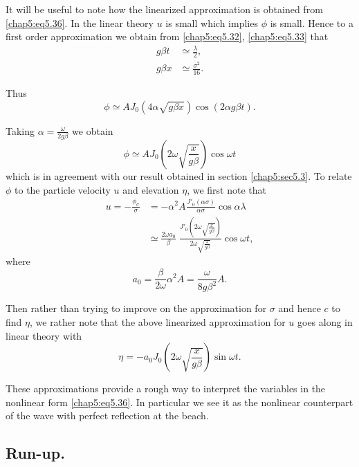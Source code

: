 It will be useful to note how the linearized approximation is obtained from \eqref{chap5:eq5.36}. In the linear theory $u$ is small which implies $\phi$ is small. Hence to a first order approximation we obtain from \eqref{chap5:eq5.32}, \eqref{chap5:eq5.33} that 
\begin{equation}
\begin{aligned}
g\beta t & \simeq \frac{\lambda}{2},\\
g\beta x &\simeq \frac{\sigma^2}{16}.
\end{aligned}\tag{5.37}\label{chap5:eq5.37}
\end{equation}

Thus
$$
\phi\simeq AJ_0\left(4\alpha\sqrt{g\beta x}\right)\cos (2\alpha g\beta t).
$$

Taking $\alpha=\frac{\omega}{2g\beta}$ we obtain
$$
\phi\simeq AJ_0\left(2\omega \sqrt{\frac{x}{g\beta}}\right)\cos\omega t
$$
which is in agreement with our result obtained in section \ref{chap5:sec5.3}. To relate $\phi$ to the particle velocity $u$ and elevation $\eta$, we first note that 
\begin{align*}
u=-\frac{\phi_\sigma}{\sigma} &= -\alpha^2A\frac{J'_0(\alpha\sigma)} {\alpha\sigma} \cos\alpha\lambda\\
&\simeq\frac{2\omega a_0}{\beta}\;\frac{J'_0\left(2\omega \sqrt{\frac{x}{g\beta}}\right)}{2\omega \sqrt{\frac{x}{g\beta}}} \cos \omega t,
\end{align*}
where\pageoriginale
\begin{equation*}
a_0=\frac{\beta}{2\omega}\alpha^2A=\frac{\omega}{8g\beta^2}A. 
\tag{5.38}\label{chap5:eq5.38}
\end{equation*}

Then rather than trying to improve on the approximation for $\sigma$ and hence $c$ to find $\eta$, we rather note that the above linearized approximation for $u$ goes along in linear theory with
\begin{equation*}
\eta=-a_0 J_0\left(2\omega \sqrt{\frac{x}{g\beta}}\right)\sin\omega t. \tag{5.39}\label{chap5:eq5.39}
\end{equation*}

These approximations provide a rough way to interpret the variables in the nonlinear form \eqref{chap5:eq5.36}. In particular we see it as the nonlinear counterpart of the wave with perfect reflection at the beach.

\subsection*{\bf Run-up.}


